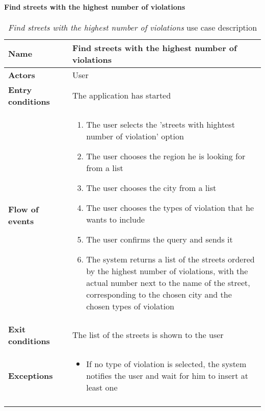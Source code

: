 		\paragraph{Find streets with the highest number of violations}
		\begin{longtable}{p{0.25\linewidth}p{0.75\linewidth}}
			\toprule
			\textbf{Name} & \textbf{Find streets with the highest number of violations} \\
			\midrule
			\textbf{Actors} & User \\
			\midrule
			\textbf{Entry conditions} & The application has started \\
			\midrule
			\textbf{Flow of events} & 
			\begin{enumerate}
				\item The user selects the 'streets with hightest number of violation' option
				\item The user chooses the region he is looking for from a list
				\item The user chooses the city from a list
				\item The user chooses the types of violation that he wants to include
				\item The user confirms the query and sends it
				\item The system returns a list of the streets ordered by the highest number of violations, with the actual number next to the name of the street, corresponding to the chosen city and the chosen types of violation
			\end{enumerate} \\
			\midrule
			\textbf{Exit conditions} & The list of the streets is shown to the user \\
			\midrule
			\textbf{Exceptions} & 
			\begin{itemize}
				\item 	If no type of violation is selected, the system notifies the user and wait for him to insert at least one	
			\end{itemize} \\
			\bottomrule
			\caption{\emph{Find streets with the highest number of violations} use case description}
		\end{longtable}
		

